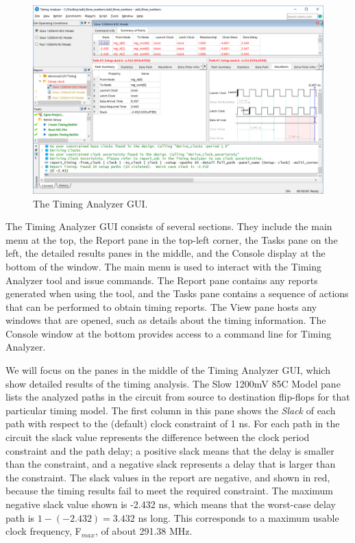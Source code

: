 \documentclass[11pt, twoside, pdftex]{article}
\begin{document}
\begin{figure}[H]
\begin{center}
\includegraphics[scale=0.5]{figures/SB3.png}
\end{center}
\caption{The Timing Analyzer GUI.}
\label{fig:SB3}
\end{figure}

The Timing Analyzer GUI consists of several sections. They include the main menu at the top, the 
Report pane in the top-left corner, the Tasks pane on the left, the detailed results panes
in the middle, and the Console display at the bottom of the window. The main menu is used 
to interact with the Timing Analyzer tool and issue commands. The Report pane contains any 
reports generated when 
using the tool, and the Tasks pane contains a sequence of actions that can be performed to
obtain timing reports. The View pane hosts any windows that are opened, such as details
about the timing information.  The Console window at the bottom provides access to a command 
line for Timing Analyzer.

We will focus on the panes in the middle of the Timing Analyzer GUI, which show detailed
results of the timing analysis. The {\sf Slow 1200mV 85C Model} pane lists the analyzed paths in the 
circuit from source to destination flip-flops for that particular timing model. The first column in this pane shows the
{\it Slack} of each path with respect to the (default) clock constraint of 1 ns.  For each
path in the circuit the slack value represents the difference between the clock period 
constraint and the path delay; a positive slack means that the delay is smaller than the 
constraint, and a negative slack represents a delay that is larger than the constraint. 
The slack values in the report are negative, and shown in red, because the timing results 
fail to meet the required constraint.  The maximum negative slack value shown is -2.432 ns, 
which means that the worst-case delay path is $1 - (-2.432) = 3.432$ ns long. This corresponds 
to a maximum usable clock frequency, F$_{max}$, of about 291.38 MHz.
\end{document}
